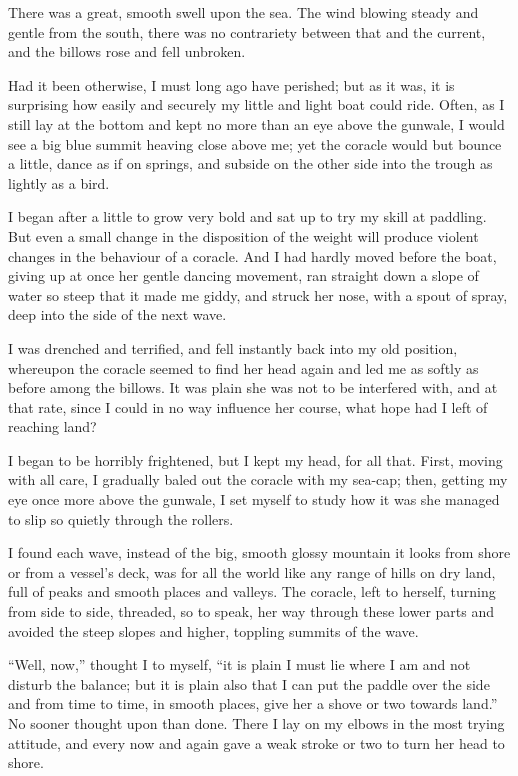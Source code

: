 There was a great, smooth swell upon the sea. The wind blowing steady and gentle from the south, there was no contrariety between that and the current, and the billows rose and fell unbroken.

Had it been otherwise, I must long ago have perished; but as it was, it is surprising how easily and securely my little and light boat could ride. Often, as I still lay at the bottom and kept no more than an eye above the gunwale, I would see a big blue summit heaving close above me; yet the coracle would but bounce a little, dance as if on springs, and subside on the other side into the trough as lightly as a bird.

I began after a little to grow very bold and sat up to try my skill at paddling. But even a small change in the disposition of the weight will produce violent changes in the behaviour of a coracle. And I had hardly moved before the boat, giving up at once her gentle dancing movement, ran straight down a slope of water so steep that it made me giddy, and struck her nose, with a spout of spray, deep into the side of the next wave.

I was drenched and terrified, and fell instantly back into my old position, whereupon the coracle seemed to find her head again and led me as softly as before among the billows. It was plain she was not to be interfered with, and at that rate, since I could in no way influence her course, what hope had I left of reaching land?

I began to be horribly frightened, but I kept my head, for all that. First, moving with all care, I gradually baled out the coracle with my sea-cap; then, getting my eye once more above the gunwale, I set myself to study how it was she managed to slip so quietly through the rollers.

I found each wave, instead of the big, smooth glossy mountain it looks from shore or from a vessel’s deck, was for all the world like any range of hills on dry land, full of peaks and smooth places and valleys. The coracle, left to herself, turning from side to side, threaded, so to speak, her way through these lower parts and avoided the steep slopes and higher, toppling summits of the wave.

\enquote{Well, now,} thought I to myself, \enquote{it is plain I must lie where I am and not disturb the balance; but it is plain also that I can put the paddle over the side and from time to time, in smooth places, give her a shove or two towards land.} No sooner thought upon than done. There I lay on my elbows in the most trying attitude, and every now and again gave a weak stroke or two to turn her head to shore.

